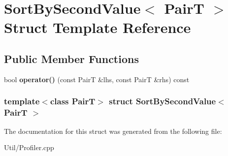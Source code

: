 \hypertarget{struct_sort_by_second_value}{
\section{\-Sort\-By\-Second\-Value$<$ \-Pair\-T $>$ \-Struct \-Template \-Reference}
\label{struct_sort_by_second_value}
}
\subsection*{\-Public \-Member \-Functions}
\begin{DoxyCompactItemize}
\item 
\hypertarget{struct_sort_by_second_value_ab275494b78541d6c37f54597d4824980}{
bool {\bfseries operator()} (const \-Pair\-T \&lhs, const \-Pair\-T \&rhs) const }
\label{struct_sort_by_second_value_ab275494b78541d6c37f54597d4824980}

\end{DoxyCompactItemize}
\subsubsection*{template$<$class Pair\-T$>$ struct Sort\-By\-Second\-Value$<$ Pair\-T $>$}



\-The documentation for this struct was generated from the following file\-:\begin{DoxyCompactItemize}
\item 
\-Util/\-Profiler.\-cpp\end{DoxyCompactItemize}
